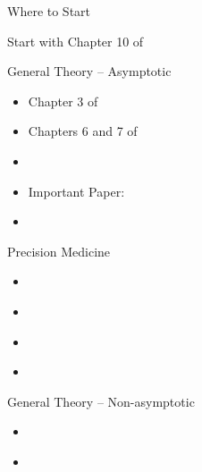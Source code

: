 \documentclass[aspectratio=169, professionalfonts]{beamer}
\begin{document}
\begin{frame}{Where to Start}
	\vfill

	Start with Chapter 10 of \cite{tsiatis2019Dynamic}
	\vfill

\end{frame}

\begin{frame}{General Theory -- Asymptotic}
	\vfill
	\begin{itemize}
		\item Chapter 3 of \cite{tsiatis2006Semiparametric}
		      \vfill
		\item Chapters 6 and 7 of \cite{vandervaart2000Asymptotic}
		      \vfill
		\item \cite{kosorok2008Introduction}
		      \vfill
		\item Important Paper: \cite{hirano2012Impossibility}
		      \vfill


		\item 	\cite{bibaut2021PostContextualBandit}
		      \vfill
	\end{itemize}
\end{frame}

\begin{frame}{Precision Medicine}
	\vfill
	\begin{itemize}
		\item \cite{laber2014Dynamic}
		      \vfill

		\item 	\cite{luedtke2016Statistical}
		      \vfill

		\item 	\cite{shi2022Statistical}

		\item \cite{hadad2021Confidence}
	\end{itemize}
	\vfill

\end{frame}

\begin{frame}{General Theory -- Non-asymptotic}
	\vfill
	\begin{itemize}
		\item \cite{waudby-smith2022Anytimevalid}
		      \vfill

		      \item\cite{howard2021Timeuniform}
	\end{itemize}
	\vfill


\end{frame}

\appendix
\printbibliography
\end{document}

